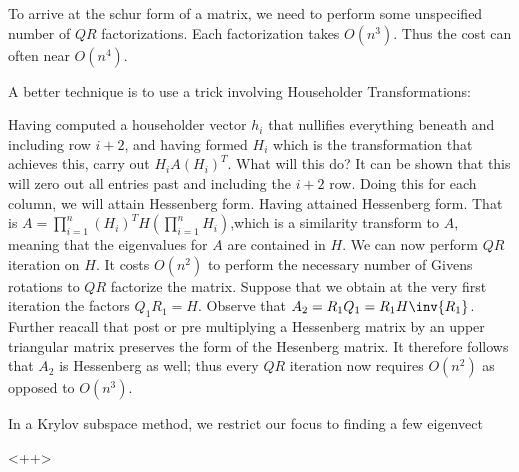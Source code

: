 \documentclass[../main.tex]{subfiles}
\begin{document}
\begin{remark}
    To arrive at the schur form of a matrix, we need to perform some unspecified number of $QR$ factorizations. Each factorization takes $O(n^3)$. Thus the cost can often near $O(n^4)$.
\end{remark}

\begin{remark}
    A better technique is to use a trick involving Householder Transformations:

    \begin{outline}
        \1 Having computed a householder vector $h_i$ that nullifies everything beneath and including row $i+2$, and having formed $H_i$ which is the transformation that achieves this, carry out $H_i A (H_i)^T$. What will this do? It can be shown that this will zero out all entries past and including the $i+2$ row. Doing this for each column, we will attain Hessenberg form. Having attained Hessenberg form. That is $A = \prod_{i=1}^{n}(H_i)^T H (\prod_{i=1}^{n}H_i)$,which is a similarity transform to $A$, meaning that the eigenvalues for $A$ are contained in $H$. We can now perform $QR$ iteration on $H$. It costs $O(n^2)$ to perform the necessary number of Givens rotations to $QR$ factorize the matrix. Suppose that we obtain at the very first iteration the factors $Q_1R_1 = H$. Observe that $A_{2} = R_1Q_1 = R_1H\inv{R_1}$. Further reacall that post or pre multiplying a Hessenberg matrix by an upper triangular matrix preserves the form of the Hesenberg matrix. It therefore follows that $A_2$ is Hessenberg as well; thus every $QR$ iteration now requires $O(n^2)$ as opposed to $O(n^3)$.
    \end{outline}
\end{remark}

\begin{remark}
    In a Krylov subspace method, we restrict our focus to finding a few eigenvect   
\end{remark}<++>
\end{document}

